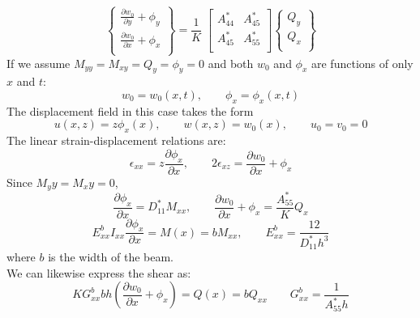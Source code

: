 \documentclass[11pt,letterpaper,titlepage,draft]{article}
\newcommand{\PDer}[2]{\frac{\partial #1}{\partial #2}}
\numberwithin{equation}{subsection}
\begin{document}
\begin{equation}
    \begin{Bmatrix}
        \PDer{w_0}{y} + \phi_y \\[3pt]
        \PDer{w_0}{x} + \phi_x \\[3pt]
    \end{Bmatrix}
     = \frac{1}{K} \; 
    \begin{bmatrix}
        A_{44}^* & A_{45}^*  \\[3pt]
        A_{45}^*  & A_{55}^*  \\[3pt]
    \end{bmatrix}
    \begin{Bmatrix}
    Q_y \\[3pt]
    Q_x \\[3pt]
    \end{Bmatrix}
\end{equation}
If we assume $M_{yy} = M_{xy} = Q_y = \phi_y = 0$ and both $w_0$ and $\phi_x$ are functions 
of only $x$ and $t$:
\begin{equation}
  w_0 = w_0\left(x,t\right), \qquad \phi_x = \phi_x\left(x,t\right)
\end{equation}
The displacement field in this case takes the form
\begin{equation}
    u(x,z) = z \phi_x(x), \qquad w(x,z) = w_0(x), \qquad u_0 = v_0 = 0
\end{equation}
The linear strain-displacement relations are:
\begin{equation}
    \epsilon_{xx} = z \PDer{\phi_x}{x}, \qquad 2\epsilon_{xz} = \PDer{w_0}{x} + \phi_x
\end{equation}
Since $M_yy = M_xy = 0$, 
\begin{equation}
    \PDer{\phi_x}{x} = D_{11}^* M_{xx}, \qquad \PDer{w_0}{x} + \phi_x = \frac{A_{55}^*}{K} Q_x
\end{equation}
\begin{equation}
    E_{xx}^b I_{xx} \PDer{\phi_x}{x} = M(x) = b M_{xx}, \qquad E_{xx}^b = \frac{12}{D_{11}^* h^3}
\end{equation}
where $b$ is the width of the beam.\\
We can likewise express the shear as:
\begin{equation}
    K G_{xx}^b b h \left(\PDer{w_0}{x} + \phi_x \right) = Q(x) = b Q_{xx} \qquad G_{xx}^b = \frac{1}{A_{55}^* h }
\end{equation}
\end{document}
